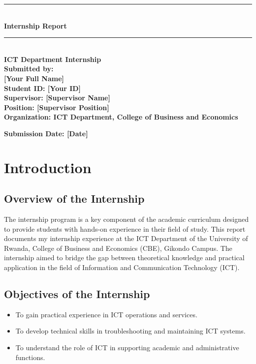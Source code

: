\documentclass[a4paper,12pt]{report}
\begin{document}
\begin{titlepage}
\begin{center}

    \rule{\linewidth}{0.5mm} \\[0.4cm]
    {\Huge \textbf{Internship Report}}\\[0.4cm]
    \rule{\linewidth}{0.5mm}\\[1cm]

    \textbf{ICT Department Internship}\\[1cm]

    \textbf{Submitted by:}\\[0.2cm]
    \textbf{[Your Full Name]}\\[0.2cm]
    \textbf{Student ID: [Your ID]}\\[1cm]

    \textbf{Supervisor: [Supervisor Name]}\\[0.2cm]
    \textbf{Position: [Supervisor Position]}\\[0.2cm]
    \textbf{Organization: ICT Department, College of Business and Economics}\\[1cm]

    \vfill

    \textbf{Submission Date: [Date]}\\[0.5cm]

\end{center}

\end{titlepage}

\tableofcontents
\newpage

\chapter{Introduction}
\section{Overview of the Internship}
The internship program is a key component of the academic curriculum designed to provide students with hands-on experience in their field of study. This report documents my internship experience at the ICT Department of the University of Rwanda, College of Business and Economics (CBE), Gikondo Campus. The internship aimed to bridge the gap between theoretical knowledge and practical application in the field of Information and Communication Technology (ICT).

\section{Objectives of the Internship}
\begin{itemize}
\item To gain practical experience in ICT operations and services.
\item To develop technical skills in troubleshooting and maintaining ICT systems.
\item To understand the role of ICT in supporting academic and administrative functions.
\end{itemize}
\end{document}
